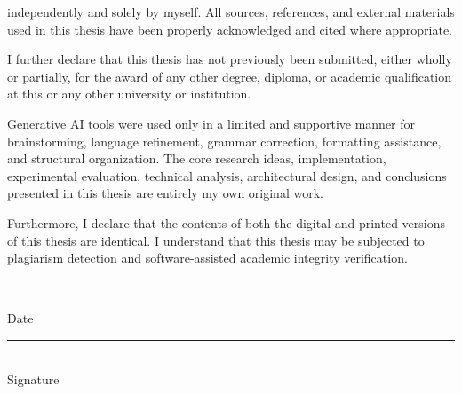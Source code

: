 \documentclass[12pt]{report}
\begin{document}
independently and solely by myself. All sources, references, and external
materials used in this thesis have been properly acknowledged and cited
where appropriate.

I further declare that this thesis has not previously been submitted,
either wholly or partially, for the award of any other degree, diploma,
or academic qualification at this or any other university or institution.

Generative AI tools were used only in a limited and supportive manner for
brainstorming, language refinement, grammar correction, formatting assistance,
and structural organization. The core research ideas, implementation,
experimental evaluation, technical analysis, architectural design, and
conclusions presented in this thesis are entirely my own original work.

Furthermore, I declare that the contents of both the digital and printed
versions of this thesis are identical. I understand that this thesis may
be subjected to plagiarism detection and software-assisted academic integrity
verification.

\vspace{4cm}

\noindent
\begin{minipage}{0.4\textwidth}
\centering
\rule{6cm}{0.4pt}\\
Date
\end{minipage}
\hfill
\begin{minipage}{0.4\textwidth}
\centering
\rule{6cm}{0.4pt}\\
Signature
\end{minipage}
\end{document}
